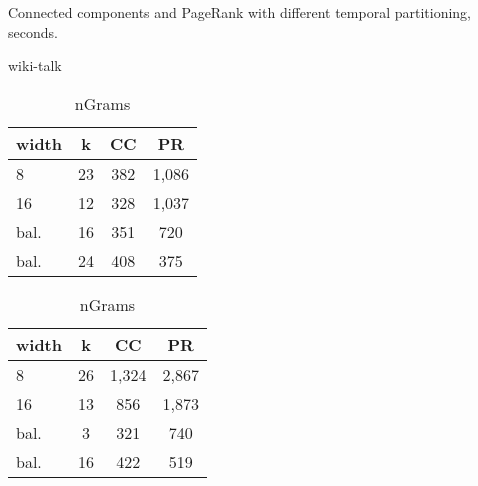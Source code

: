 \begin{table}
\centering
\caption{Connected components and PageRank with different temporal partitioning, seconds.}
\vspace{-0.2cm}
\begin{subtable}{0.229\textwidth}
\small
\caption{wiki-talk}
\vspace{-0.2cm}
\begin{tabular}{| l | c | c | c |}
\hline
\multicolumn{1}{|l|}{\bfseries width} & \multicolumn{1}{c|}{\bfseries k} & \multicolumn{1}{c|}{\bfseries CC} & \multicolumn{1}{c|}{\bfseries PR} \\ \hline
8 & 23 & 382 & 1,086 \\ \hline
16 & 12 & 328 & 1,037 \\ \hline
bal. & 16 & 351 & 720 \\ \hline
bal. & 24 & 408 & 375 \\ \hline
\end{tabular}
\label{fig:splitwiki}
\end{subtable}
\begin{subtable}{0.229\textwidth}
\small
\caption{nGrams}
\vspace{-0.2cm}
\begin{tabular}{| l | c | c | c |}
\hline
\multicolumn{1}{|l|}{\bfseries width} & \multicolumn{1}{c|}{\bfseries k} & \multicolumn{1}{c|}{\bfseries CC} & \multicolumn{1}{c|}{\bfseries PR} \\ \hline
8 & 26 & 1,324 & 2,867 \\ \hline
16 & 13 & 856 & 1,873  \\ \hline
bal. & 3 & 321 & 740  \\ \hline
bal. & 16 & 422 & 519 \\ \hline
\end{tabular}
\label{fig:splitngrams}
\end{subtable}
\label{tab:splitres}
\vspace{-0.4cm}
\end{table}


